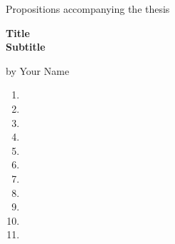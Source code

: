 \begin{center}
Propositions accompanying the thesis

\textbf{Title \ \\Subtitle}

by Your Name
\end{center}



\begin{enumerate}
\item 
\item 
\item 
\item 
\item 
\item 
\item 
\item 
\item 
\item 
\item 
\end{enumerate}
